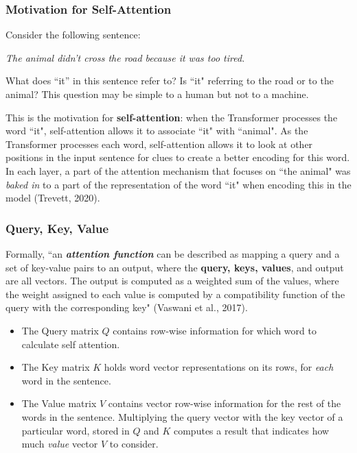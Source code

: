 \subsubsection{Motivation for Self-Attention}

Consider the following sentence: 


\begin{shadequote}{}
\vspace{10pt}
\Large \textit{The animal didn't cross the road because it was too tired.}
\vspace{10pt}
\end{shadequote}

What does ``it” in this sentence refer to? Is ``it" referring to the road or to the animal? This question may be simple to a human but not to a machine.  

This is the motivation for \textbf{self-attention}: when the Transformer processes the word ``it", self-attention allows it to associate ``it" with ``animal". As the Transformer processes each word, self-attention allows it to look at other positions in the input sentence for clues to create a better encoding for this word. In each layer, a part of the attention mechanism that focuses on ``the animal" was \emph{baked in} to a part of the representation of the word ``it" when encoding this in the model (Trevett, 2020). 


\subsubsection{Query, Key, Value}

Formally, ``an \textbf{\textit{attention function}} can be described as mapping a query and a set of key-value pairs to an output, where the \textbf{query, keys, values}, and output are all vectors. The output is computed as a weighted sum of the values, where the weight assigned to each value is computed by a compatibility function of the query with the corresponding key" (Vaswani et al., 2017). 

\begin{itemize}
    \item The Query matrix $Q$ contains row-wise information for which word to calculate self attention. 
    
     \item The Key matrix $K$ holds word vector representations on its rows, for \emph{each} word in the sentence.
     
    \item The Value matrix $V$ contains vector row-wise information for the rest of the words in the sentence. Multiplying the query vector with the key vector of a particular word, stored in $Q$ and $K$ computes a result that indicates how much \emph{value} vector $V$ to consider.
\end{itemize}


